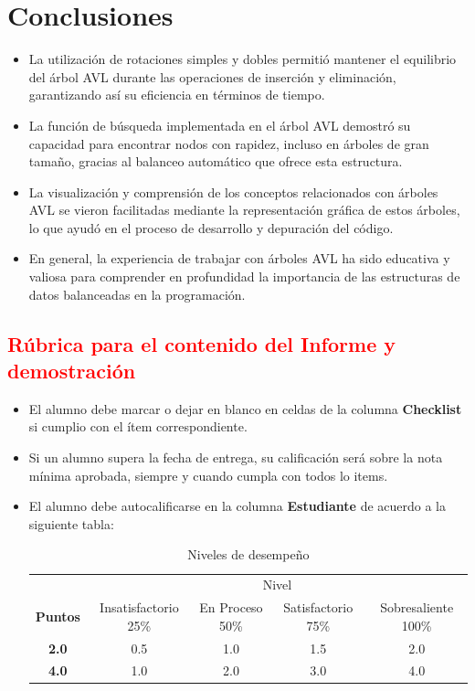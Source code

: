 \documentclass{article}
\begin{document}

  \section{Conclusiones}
  \begin{itemize}
    \item La utilización de rotaciones simples y dobles permitió mantener el equilibrio del árbol AVL durante las operaciones de inserción y eliminación, garantizando así su eficiencia en términos de tiempo.
    \item La función de búsqueda implementada en el árbol AVL demostró su capacidad para encontrar nodos con rapidez, incluso en árboles de gran tamaño, gracias al balanceo automático que ofrece esta estructura.
    \item La visualización y comprensión de los conceptos relacionados con árboles AVL se vieron facilitadas mediante la representación gráfica de estos árboles, lo que ayudó en el proceso de desarrollo y depuración del código.
    \item En general, la experiencia de trabajar con árboles AVL ha sido educativa y valiosa para comprender en profundidad la importancia de las estructuras de datos balanceadas en la programación.
  \end{itemize}

	\newpage
	\subsection{\textcolor{red}{Rúbrica para el contenido del Informe y demostración}}
	\begin{itemize}			
		\item El alumno debe marcar o dejar en blanco en celdas de la columna \textbf{Checklist} si cumplio con el ítem correspondiente.
		\item Si un alumno supera la fecha de entrega,  su calificación será sobre la nota mínima aprobada, siempre y cuando cumpla con todos lo items.
		\item El alumno debe autocalificarse en la columna \textbf{Estudiante} de acuerdo a la siguiente tabla:
	
		\begin{table}[ht]
			\caption{Niveles de desempeño}
			\begin{center}
			\begin{tabular}{ccccc}
    			\hline
    			 & \multicolumn{4}{c}{Nivel}\\
    			\cline{1-5}
    			\textbf{Puntos} & Insatisfactorio 25\%& En Proceso 50\% & Satisfactorio 75\% & Sobresaliente 100\%\\
    			\textbf{2.0}&0.5&1.0&1.5&2.0\\
    			\textbf{4.0}&1.0&2.0&3.0&4.0\\
    		\hline
			\end{tabular}
		\end{center}
	\end{table}	
	

	\end{itemize}
\end{document}

